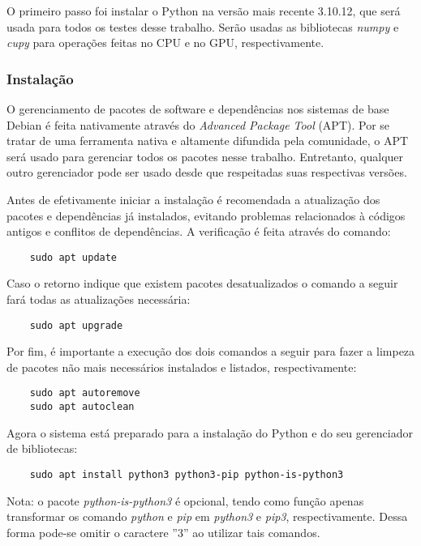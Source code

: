 \documentclass[12pt,a4paper]{article}
\begin{document}
O primeiro passo foi instalar o Python na versão mais recente 3.10.12, que será usada para todos os testes desse trabalho. Serão usadas as bibliotecas \emph{numpy} e \emph{cupy} para operações feitas no CPU e no GPU, respectivamente.

\subsubsection{Instalação}

O gerenciamento de pacotes de software e dependências nos sistemas de base Debian é feita nativamente através do \emph{Advanced Package Tool} (APT). Por se tratar de uma ferramenta nativa e altamente difundida pela comunidade, o APT será usado para gerenciar todos os pacotes nesse trabalho. Entretanto, qualquer outro gerenciador pode ser usado desde que respeitadas suas respectivas versões.

Antes de efetivamente iniciar a instalação é recomendada a atualização dos pacotes e dependências já instalados, evitando problemas relacionados à códigos antigos e conflitos de dependências. A verificação é feita através do comando:

\begin{verbatim}
    sudo apt update
\end{verbatim}

Caso o retorno indique que existem pacotes desatualizados o comando a seguir fará todas as atualizações necessária:

\begin{verbatim}
    sudo apt upgrade
\end{verbatim}

Por fim, é importante a execução dos dois comandos a seguir para fazer a limpeza de pacotes não mais necessários instalados e listados, respectivamente:

\begin{verbatim}
    sudo apt autoremove
    sudo apt autoclean
\end{verbatim}

Agora o sistema está preparado para a instalação do Python e do seu gerenciador de bibliotecas:

\begin{verbatim}
    sudo apt install python3 python3-pip python-is-python3
\end{verbatim}

Nota: o pacote \emph{python-is-python3} é opcional, tendo como função apenas transformar os comando \emph{python} e \emph{pip} em \emph{python3} e \emph{pip3}, respectivamente. Dessa forma pode-se omitir o caractere ''3'' ao utilizar tais comandos.
\end{document}
